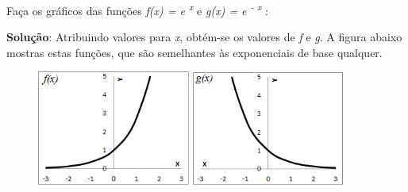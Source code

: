 \begin{texemplo}
Faça os gráficos das funções \textit{f(x) =  e\textsuperscript{ x}} e  \textit{g(x) =  e\textsuperscript{ - x}} :

\textbf{Solução}: Atribuindo valores para \textit{x}, obtém-se os valores de \textit{f} e \textit{g}. A figura abaixo mostras estas funções, que são semelhantes às exponenciais de base qualquer. 

\begin{figure}[H]
    \includegraphics[width=0.45\textwidth]{capitulos/potencias_e_funcoes_exponenciais/media/image15.png} 
    \includegraphics[width=0.45\textwidth]{capitulos/potencias_e_funcoes_exponenciais/media/image16.png}
\end{figure}
\end{texemplo}

